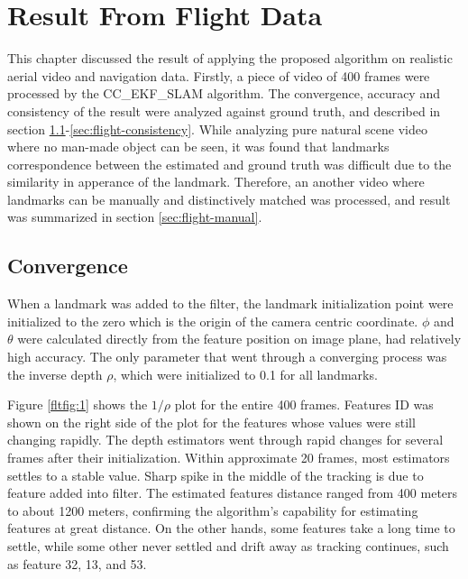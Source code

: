 \chapter{Result From Flight Data}\label{ch:FlightResult}

This chapter discussed the result of applying the proposed algorithm
on realistic aerial video and navigation data. Firstly, a piece of
video of 400 frames were processed by the CC\_EKF\_SLAM algorithm. The
convergence, accuracy and consistency of the result were analyzed
against ground truth, and described in section
\ref{sec:flight-converge}-\ref{sec:flight-consistency}. While
analyzing pure natural scene video where no man-made object can be
seen, it was found that landmarks correspondence between the
estimated and ground truth was difficult due to the
similarity in apperance of the landmark. Therefore, an another video
where landmarks can be manually and distinctively matched was
processed, and result was summarized in section \ref{sec:flight-manual}.

\section{Convergence}\label{sec:flight-converge}
When a landmark was added to the filter, the landmark initialization
point were initialized to the zero which is the origin of the camera
centric coordinate. $\phi$ and $\theta$ were calculated directly from
the feature position on image plane, had relatively high accuracy. The
only parameter that went through a converging process was the inverse
depth $\rho$, which were initialized to 0.1 for all landmarks.

Figure \ref{fltfig:1} shows the $1/\rho$ plot for the entire 400
frames. Features ID was shown on the right side of the plot for the
features whose values were still changing rapidly. The depth
estimators went through rapid changes for several frames after their
initialization. Within approximate 20 frames, most estimators settles
to a stable value. Sharp spike in the middle of the tracking is due to
feature added into filter. The estimated features distance ranged from
400 meters to about 1200 meters, confirming the algorithm's capability
for estimating features at great distance. On the other hands, some
features take a long time to settle, while some other never settled
and drift away as tracking continues, such as feature 32, 13, and 53.

